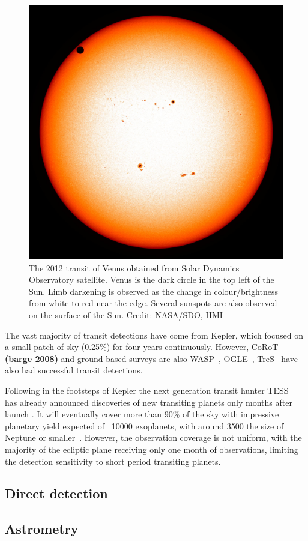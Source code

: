 \begin{figure}
    \centering
    \includegraphics[width=0.3\linewidth]{./figures/introduction/SDO_2012_Venus_Transit.jpg}
    \caption{The 2012 transit of Venus obtained from Solar Dynamics Observatory satellite. Venus is the dark circle in the top left of the Sun. Limb darkening is observed as the change in colour/brightness from white to red near the edge. Several sunspots are also observed on the surface of the Sun. Credit: NASA/SDO, HMI}
    \label{fig:transit_venus}
\end{figure}


The vast majority of transit detections have come from Kepler\citep{borucki_characteristics_2011}, which focused on a small patch of sky (0.25\%) for four years continuously.
However, {CoRoT} \textbf{(barge 2008)} and ground-based surveys are also WASP~\citet{pollacco_wasp_2006}, OGLE~\citep{udalski_optical_2002}, TreS~\citep{alonso_tres1_2004} have also had successful transit detections.

Following in the footsteps of Kepler the next generation transit hunter TESS~\citep{ricker_transiting_2014} has already announced discoveries of new transiting planets only months after launch \citet{vanderspek_tess_2018, gandolfi_tesss_2018, huang_tess_2018}.
It will eventually cover more than 90\% of the sky with impressive planetary yield expected of ~10000 exoplanets, with around 3500 the size of Neptune or smaller~\citep{barclay_revisded_2018, huang_expected_2018}.
However, the observation coverage is not uniform, with the majority of the ecliptic plane receiving only one month of observations, limiting the detection sensitivity to short period transiting planets.


\subsection{Direct detection}



\subsection{Astrometry}

